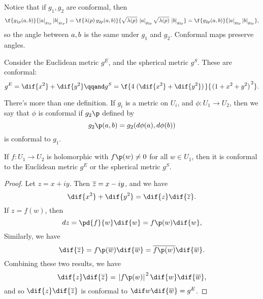 Notice that if $g_1,g_2$ are conformal, then
\begin{equation*}
	\f{g_{1\pp}(\va,\vb)}{\left\vert \va \right\vert_{g_{1\pp}} \left\vert \vb \right\vert_{g_{1\pp}}}
	= \f{\lambda(\pp)\,g_{2\pp}(\va,\vb)}{ \sqrt{\lambda(\pp)}\, \left\vert \va \right\vert_{g_{2\pp}} \sqrt{\lambda(\pp)}\,\left\vert \vb \right\vert_{g_{2\pp}}}
	= \f{g_{2\pp}(\va,\vb)}{\left\vert \va \right\vert_{g_{2\pp}} \left\vert \vb \right\vert_{g_{2\pp}}},
\end{equation*}
so the angle between $a, b$ is the same under $g_1$ and $g_2$. Conformal maps preserve angles.

\begin{example}
	Consider the Euclidean metric $g^E$, and the spherical metric $g^S$. These are conformal:
	\begin{equation*}
		g^E = \dif{x^2} + \dif{y^2} \qqand
		g^S = \f{4\left.( \dif{x^2} + \dif{y^2})\right.}{\left.( 1+x^2+y^2 )\right.^2}.
	\end{equation*}
\end{example}

There's more than one definition. If $g_i$ is a metric on $U_i$, and $\phi:U_1\to U_2$, then we say that $\phi$ is conformal if $g_2\p$ defined by
\begin{equation*}
	g_2\p(\va,\vb) = g_2(d\phi(\va), d\phi(\vb))
\end{equation*}
is conformal to $g_1$.


\begin{proposition}
	If $f:U_1\to U_2$ is holomorphic with $f\p(w)\neq 0$ for all $w\in U_1$, then it is conformal to the Euclidean metric $g^E$ or the spherical metric $g^S$.
\end{proposition}

\begin{proof}
	Let $z=x+iy$. Then $\overline{z}=x-iy$, and we have
	\begin{equation*}
		\dif{x^2} + \dif{y^2} = \dif{z} \dif{\zbar}.
	\end{equation*}
	If $z=f(w)$, then
	\begin{equation*}
		dz = \pd{f}{w} \dif{w} = f\p(w) \dif{w},
	\end{equation*}
	Similarly, we have
	\begin{equation*}
		\dif{\zbar} = f\p(\wbar) \dif{\wbar} = \overline{f\p(w)} \dif{\wbar}.
	\end{equation*}
	Combining these two results, we have
	\begin{equation*}
		\dif{z} \dif{\zbar} = \left.|f\p(w)|\right.^2 \dif{w} \dif{\wbar},
	\end{equation*}
	and so $\dif{z} \dif{\zbar}$ is conformal to $\dif w \dif{\wbar} = g^E$.
\end{proof}

